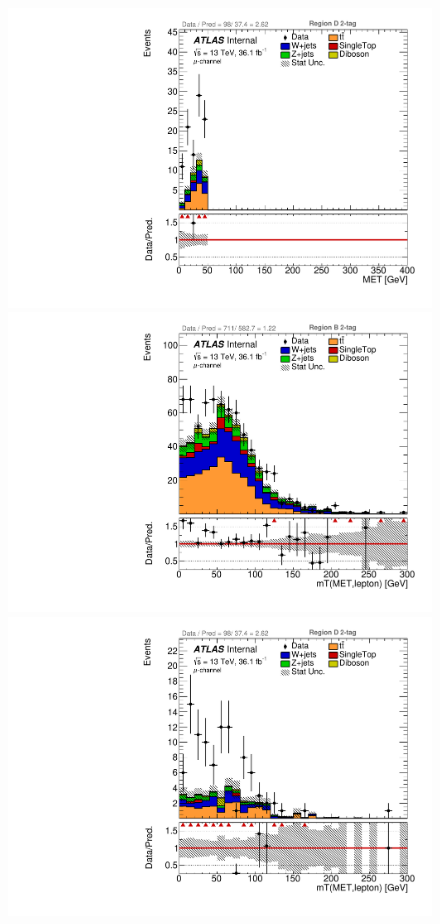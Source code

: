 \begin{figure}[!htbp]
\begin{center}
\includegraphics[scale=0.23]{./figures/boosted/ABCD/muon_Inc_RegionD_MET}\\
\includegraphics[scale=0.23]{./figures/boosted/ABCD/muon_Inc_RegionB_WlepMtATLAS}
\includegraphics[scale=0.23]{./figures/boosted/ABCD/muon_Inc_RegionD_WlepMtATLAS}\\

\end{center}
\end{figure}
